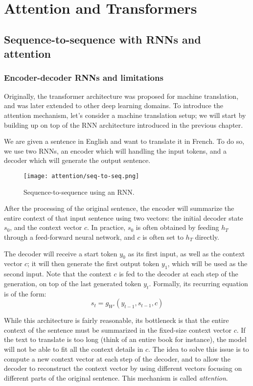 \section{Attention and Transformers}
\subsection{Sequence-to-sequence with RNNs and attention}
\subsubsection{Encoder-decoder RNNs and limitations}
Originally, the transformer architecture was proposed for machine translation, and was later extended to other deep learning domains. To introduce the attention mechanism, let's consider a machine translation setup; we will start by building up on top of the RNN architecture introduced in the previous chapter.

We are given a sentence in English and want to translate it in French. To do so, we use two RNNs, an encoder which will handling the input tokens, and a decoder which will generate the output sentence.
\begin{figure}[H]
    \centering
    \texttt{[image: attention/seq-to-seq.png]}
    \caption{Sequence-to-sequence using an RNN.}
\end{figure}
After the processing of the original sentence, the encoder will summarize the entire context of that input sentence using two vectors: the initial decoder state $s_0$, and the context vector $c$. In practice, $s_0$ is often obtained by feeding $h_T$ through a feed-forward neural network, and $c$ is often set to $h_T$ directly.

The decoder will receive a start token $y_0$ as its first input, as well as the context vector $c$; it will then generate the first output token $y_1$, which will be used as the second input. Note that the context $c$ is fed to the decoder at each step of the generation, on top of the last generated token $y_t$. Formally, its recurring equation is of the form:
\begin{equation*}
    s_t = g_{W'}(y_{t-1}, s_{t-1}, c)
\end{equation*}

While this architecture is fairly reasonable, its bottleneck is that the entire context of the sentence must be summarized in the fixed-size context vector $c$. If the text to translate is too long (think of an entire book for instance), the model will not be able to fit all the context details in $c$. The idea to solve this issue is to compute a new context vector at each step of the decoder, and to allow the decoder to reconstruct the context vector by using different vectors focusing on different parts of the original sentence. This mechanism is called \emph{attention}.

